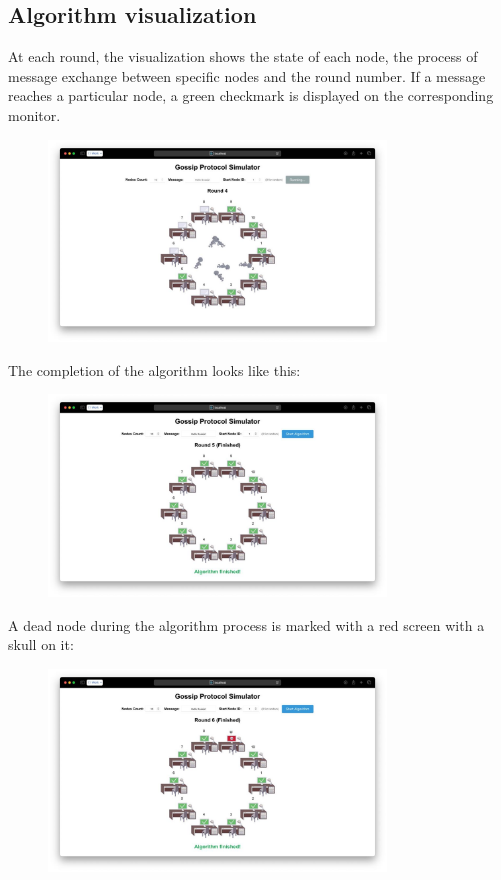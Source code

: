 \documentclass[a4paper,12pt]{article}
\begin{document}
\subsection{Algorithm visualization}
At each round, the visualization shows the state of each node, the process of message exchange between specific nodes and the round number. If a message reaches a particular node, a green checkmark is displayed on the corresponding monitor.
\begin{figure}[H]
    \centering
    \includegraphics[width=0.8\textwidth]{figures/alg_visualisation.jpeg}
    \label{fig:screenshot3}
\end{figure}

The completion of the algorithm looks like this:
\begin{figure}[H]
    \centering
    \includegraphics[width=0.8\textwidth]{figures/finished.jpeg}
    \label{fig:screenshot4}
\end{figure}

A dead node during the algorithm process is marked with a red screen with a skull on it:
\begin{figure}[H]
    \centering
    \includegraphics[width=0.8\textwidth]{figures/node_dead.jpeg}
    \label{fig:screenshot5}
\end{figure}
\end{document}
